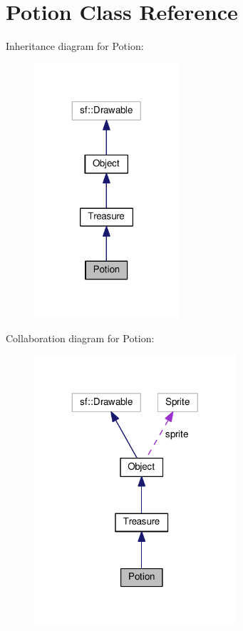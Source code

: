 \hypertarget{classPotion}{\section{Potion Class Reference}
\label{classPotion}
}


Inheritance diagram for Potion\+:
\nopagebreak
\begin{figure}[H]
\begin{center}
\leavevmode
\includegraphics[width=152pt]{classPotion__inherit__graph}
\end{center}
\end{figure}


Collaboration diagram for Potion\+:
\nopagebreak
\begin{figure}[H]
\begin{center}
\leavevmode
\includegraphics[width=212pt]{classPotion__coll__graph}
\end{center}
\end{figure}
